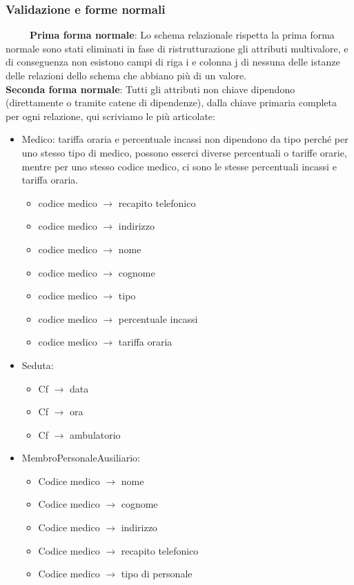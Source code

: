 \documentclass[11pt]{article}
\begin{document}
\subsubsection{Validazione e forme normali}
~~~~~\textbf{Prima forma normale}: Lo schema relazionale rispetta la prima forma normale sono stati eliminati in fase di ristrutturazione gli attributi multivalore, 
e di conseguenza non esistono campi di riga i e colonna j di nessuna delle istanze delle relazioni dello schema che abbiano più di un valore.\\

\textbf{Seconda forma normale}: Tutti gli attributi non chiave dipendono (direttamente o tramite catene di dipendenze), dalla chiave primaria completa per ogni relazione, qui scriviamo le più articolate:

\begin{itemize}
    \item Medico: tariffa oraria e percentuale incassi non dipendono da tipo perché per uno stesso tipo di medico, possono esserci diverse percentuali o tariffe orarie, mentre per uno stesso codice medico, ci sono le stesse percentuali incassi e tariffa oraria.
    \begin{itemize}
        \item codice medico $\rightarrow$ recapito telefonico
        \item codice medico $\rightarrow$ indirizzo
        \item codice medico $\rightarrow$ nome
        \item codice medico $\rightarrow$ cognome
        \item codice medico $\rightarrow$ tipo
        \item codice medico $\rightarrow$ percentuale incassi
        \item codice medico $\rightarrow$ tariffa oraria
    \end{itemize}

    \item Seduta:
    \begin{itemize}
        \item Cf $\rightarrow$ data
        \item Cf $\rightarrow$ ora
        \item Cf $\rightarrow$ ambulatorio
    \end{itemize}
    \item MembroPersonaleAusiliario:
    \begin{itemize}
        \item Codice medico $\rightarrow$ nome
        \item Codice medico $\rightarrow$ cognome
        \item Codice medico $\rightarrow$ indirizzo
        \item Codice medico $\rightarrow$ recapito telefonico
        \item Codice medico $\rightarrow$ tipo di personale
    \end{itemize}


\end{itemize}
\end{document}
